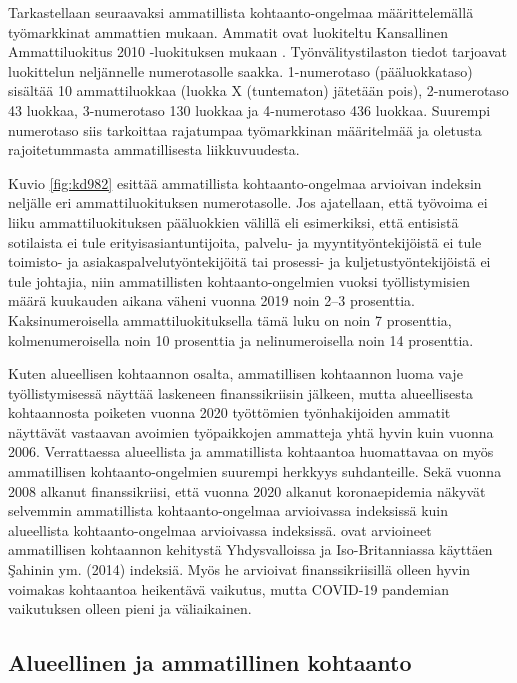 \documentclass[12pt]{article}
\begin{document}
Tarkastellaan seuraavaksi ammatillista kohtaanto-ongelmaa määrittelemällä työmarkkinat ammattien mukaan. Ammatit ovat luokiteltu Kansallinen Ammattiluokitus 2010 -luokituksen mukaan \cite{tilastokeskus2011ammattiluokitus}. Työnvälitystilaston tiedot tarjoavat luokittelun neljännelle numerotasolle saakka. 1-numerotaso (pääluokkataso) sisältää 10 ammattiluokkaa (luokka X (tuntematon) jätetään pois), 2-numerotaso 43 luokkaa, 3-numerotaso 130 luokkaa ja 4-numerotaso 436 luokkaa. Suurempi numerotaso siis tarkoittaa rajatumpaa työmarkkinan määritelmää ja oletusta rajoitetummasta ammatillisesta liikkuvuudesta. 

Kuvio \ref{fig:kd982} esittää ammatillista kohtaanto-ongelmaa arvioivan indeksin neljälle eri ammattiluokituksen numerotasolle. Jos ajatellaan, että työvoima ei liiku ammattiluokituksen pääluokkien välillä eli esimerkiksi, että entisistä sotilaista ei tule erityisasiantuntijoita, palvelu- ja myyntityöntekijöistä ei tule toimisto- ja asiakaspalvelutyöntekijöitä tai prosessi- ja kuljetustyöntekijöistä ei tule johtajia, niin ammatillisten kohtaanto-ongelmien vuoksi työllistymisien määrä kuukauden aikana väheni vuonna 2019 noin 2–3 prosenttia. Kaksinumeroisella ammattiluokituksella tämä luku on noin 7 prosenttia, kolmenumeroisella noin 10 prosenttia ja nelinumeroisella noin 14 prosenttia.

Kuten alueellisen kohtaannon osalta, ammatillisen kohtaannon luoma vaje työllistymisessä näyttää laskeneen finanssikriisin jälkeen, mutta alueellisesta kohtaannosta poiketen vuonna 2020 työttömien työnhakijoiden ammatit näyttävät vastaavan avoimien työpaikkojen ammatteja yhtä hyvin kuin vuonna 2006. Verrattaessa alueellista ja ammatillista kohtaantoa huomattavaa on myös ammatillisen kohtaanto-ongelmien suurempi herkkyys suhdanteille. Sekä vuonna 2008 alkanut finanssikriisi, että vuonna 2020 alkanut koronaepidemia näkyvät selvemmin ammatillista kohtaanto-ongelmaa arvioivassa indeksissä kuin alueellista kohtaanto-ongelmaa arvioivassa indeksissä.  ovat arvioineet ammatillisen kohtaannon kehitystä Yhdysvalloissa ja Iso-Britanniassa käyttäen {\c{S}}ahinin ym. (2014) indeksiä. Myös he arvioivat finanssikriisillä olleen hyvin voimakas kohtaantoa heikentävä vaikutus, mutta COVID-19 pandemian vaikutuksen olleen pieni ja väliaikainen. 

\subsection{Alueellinen ja ammatillinen kohtaanto} \label{section:alueellinen ja ammatillinen kohtaanto}
\end{document}
